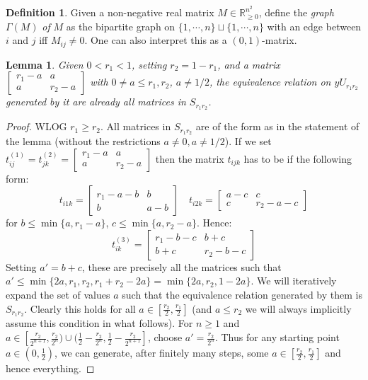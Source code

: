 \documentclass[a4paper]{amsproc}
\theoremstyle{plain}
\newtheorem{lemma}[theorem]{Lemma}
\theoremstyle{definition}
\newtheorem{definition}[theorem]{Definition}
\theoremstyle{remark}
\numberwithin{equation}{section}
\begin{document}
\begin{definition} Given a non-negative real matrix $M\in \mathbb{R}^{n^2}_{\geq 0}$, define the \emph{graph }$\Gamma(M)$\emph{ of }$M$ as the bipartite graph on $\{1, \cdots, n\}\sqcup \{1, \cdots, n\}$ with an edge between $i$ and $j$ iff $M_{ij}\neq 0$. One can also interpret this as a $(0,1)$-matrix.
\end{definition}
\begin{lemma}\label{2x2x2} Given $0<r_1<1$, setting $r_2=1-r_1$, and  a matrix $\begin{bmatrix}
r_1-a & a\\
a &r_2-a
\end{bmatrix}$ with $0\neq a \leq r_1,r_2$, $a\neq 1/2$, the equivalence relation on $yU_{r_1 r_2}$ generated by it are already all matrices in $S_{r_1r_2}$. 
\end{lemma}
\begin{proof} WLOG $r_1\geq r_2$. All matrices in $S_{r_1r_2}$ are of the form as in the statement of the lemma (without the restrictions $a\neq 0,a\neq  1/2$). If we set $t^{(1)}_{ij}=t^{(2)}_{jk}=\begin{bmatrix}
r_1-a & a\\
a &r_2-a
\end{bmatrix}$ then the matrix $t_{ijk}$ has to be if the following form:
\[t_{i1k}=\begin{bmatrix}
r_1-a-b & b\\
b & a-b
\end{bmatrix} \quad t_{i2k}=\begin{bmatrix}
a-c & c\\
c & r_2-a-c 
\end{bmatrix}\]
for $b\leq \min \{a, r_1-a \}$, $c\leq \min \{a,r_2-a\}$. Hence:
\[ t_{ik}^{(3)}=\begin{bmatrix}
r_1-b-c &b+ c\\
b+c & r_2-b-c 
\end{bmatrix}
\]
Setting $a'=b+c$, these are precisely all the matrices such that $a'\leq \min\{2a, r_1, r_2, r_1+r_2-2a   \}=\min \{2a,r_2, 1-2a \}$. We will iteratively expand the set of  values $a$ such that the equivalence relation generated by them is $S_{r_1r_2}$. 
Clearly this holds for all $a\in [\frac{r_2}{2},\frac{ r_1}{2}  ]$ (and $a\leq r_2$ we will always implicitly assume this condition in what follows).\newline
\indent For $n\geq 1$ and $a\in [\frac{r_2}{2^{n+1}},\frac{r_2}{2^n})\cup (\frac{1}{2}-\frac{r_2}{2^n}, \frac{1}{2}-\frac{r_2}{2^{n+1}}] $, choose $a'=\frac{r_2}{2^n}$. Thus for any starting point $a\in (0,\frac{1}{2})$, we can generate, after finitely many steps, some $a\in  [\frac{r_2}{2},\frac{ r_1}{2}  ]$ and hence everything. 
\end{proof}
\end{document}
